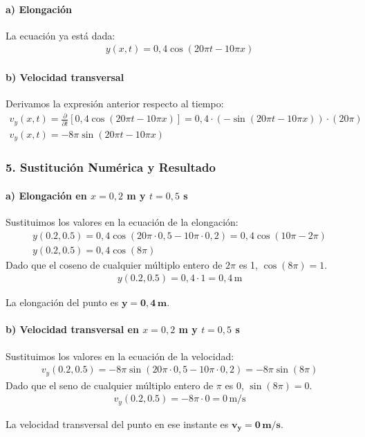 \paragraph{a) Elongación}
La ecuación ya está dada:
\begin{gather}
    y(x,t) = 0,4\cos(20\pi t - 10\pi x)
\end{gather}

\paragraph{b) Velocidad transversal}
Derivamos la expresión anterior respecto al tiempo:
\begin{gather}
    v_y(x,t) = \frac{\partial}{\partial t} [0,4\cos(20\pi t - 10\pi x)] = 0,4 \cdot (-\sin(20\pi t - 10\pi x)) \cdot (20\pi) \nonumber \\
    v_y(x,t) = -8\pi \sin(20\pi t - 10\pi x)
\end{gather}

\subsubsection*{5. Sustitución Numérica y Resultado}
\paragraph{a) Elongación en $x=0,2$ m y $t=0,5$ s}
Sustituimos los valores en la ecuación de la elongación:
\begin{gather}
    y(0.2, 0.5) = 0,4\cos(20\pi \cdot 0,5 - 10\pi \cdot 0,2) = 0,4\cos(10\pi - 2\pi) \nonumber \\
    y(0.2, 0.5) = 0,4\cos(8\pi)
\end{gather}
Dado que el coseno de cualquier múltiplo entero de $2\pi$ es 1, $\cos(8\pi)=1$.
\begin{gather}
    y(0.2, 0.5) = 0,4 \cdot 1 = 0,4\,\text{m}
\end{gather}
\begin{cajaresultado}
La elongación del punto es $\boldsymbol{y = 0,4\,\textbf{m}}$.
\end{cajaresultado}

\paragraph{b) Velocidad transversal en $x=0,2$ m y $t=0,5$ s}
Sustituimos los valores en la ecuación de la velocidad:
\begin{gather}
    v_y(0.2, 0.5) = -8\pi \sin(20\pi \cdot 0,5 - 10\pi \cdot 0,2) = -8\pi \sin(8\pi)
\end{gather}
Dado que el seno de cualquier múltiplo entero de $\pi$ es 0, $\sin(8\pi)=0$.
\begin{gather}
    v_y(0.2, 0.5) = -8\pi \cdot 0 = 0\,\text{m/s}
\end{gather}
\begin{cajaresultado}
La velocidad transversal del punto en ese instante es $\boldsymbol{v_y = 0\,\textbf{m/s}}$.
\end{cajaresultado}

